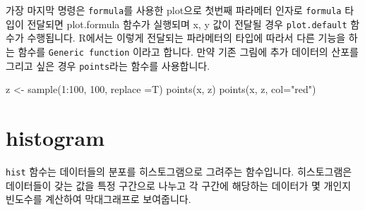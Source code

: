 \documentclass[
]{book}
\newenvironment{Shaded}{\begin{snugshade}}{\end{snugshade}}
\newcommand{\AttributeTok}[1]{\textcolor[rgb]{0.77,0.63,0.00}{#1}}
\newcommand{\DecValTok}[1]{\textcolor[rgb]{0.00,0.00,0.81}{#1}}
\newcommand{\FunctionTok}[1]{\textcolor[rgb]{0.00,0.00,0.00}{#1}}
\newcommand{\NormalTok}[1]{#1}
\newcommand{\OtherTok}[1]{\textcolor[rgb]{0.56,0.35,0.01}{#1}}
\newcommand{\SpecialCharTok}[1]{\textcolor[rgb]{0.00,0.00,0.00}{#1}}
\newcommand{\StringTok}[1]{\textcolor[rgb]{0.31,0.60,0.02}{#1}}
\begin{document}
\begin{Shaded}
\end{Shaded}

가장 마지막 명령은 \texttt{formula}를 사용한 plot으로 첫번째 파라메터 인자로 \texttt{formula} 타입이 전달되면 plot.formula 함수가 실행되며 x, y 값이 전달될 경우 \texttt{plot.default} 함수가 수행됩니다. R에서는 이렇게 전달되는 파라메터의 타입에 따라서 다른 기능을 하는 함수를 \texttt{Generic\ function} 이라고 합니다. 만약 기존 그림에 추가 데이터의 산포를 그리고 싶은 경우 \texttt{points}라는 함수를 사용합니다.

\begin{Shaded}
\begin{Highlighting}[]
\NormalTok{z }\OtherTok{\textless{}{-}} \FunctionTok{sample}\NormalTok{(}\DecValTok{1}\SpecialCharTok{:}\DecValTok{100}\NormalTok{, }\DecValTok{100}\NormalTok{, }\AttributeTok{replace =}\NormalTok{T)}
\FunctionTok{points}\NormalTok{(x, z)}
\FunctionTok{points}\NormalTok{(x, z, }\AttributeTok{col=}\StringTok{"red"}\NormalTok{)}
\end{Highlighting}
\end{Shaded}

\hypertarget{histogram}{%
\section{histogram}\label{histogram}}

\texttt{hist} 함수는 데이터들의 분포를 히스토그램으로 그려주는 함수입니다. 히스토그램은 데이터들이 갖는 값을 특정 구간으로 나누고 각 구간에 해당하는 데이터가 몇 개인지 빈도수를 계산하여 막대그래프로 보여줍니다.
\end{document}

